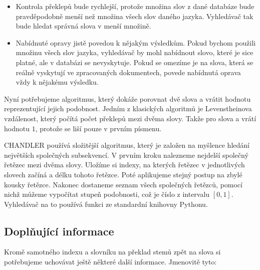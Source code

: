 \documentclass[12pt]{article}
\newcommand{\name}{CHANDLER}
\newcommand{\ssection}[1]{\subsection{#1}}
\begin{document}
\begin{itemize}
	\item Kontrola překlepů bude rychlejší, protože množina slov z dané databáze bude pravděpodobně menší než množina všech slov daného jazyka. Vyhledávač tak bude hledat správná slova v menší množině. 
	\item Nabídnuté opravy jistě povedou k nějakým výsledkům. Pokud bychom použili množinu všech slov jazyka, vyhledávač by mohl nabídnout slovo, které je sice platné, ale v databázi se nevyskytuje. Pokud se omezíme je na slova, která se reálně vyskytují ve zpracovaných dokumentech, povede nabídnutá oprava vždy k nějakému výsledku.
\end{itemize}

Nyní potřebujeme algoritmus, který dokáže porovnat dvě slova a vrátit hodnotu reprezentující jejich podobnost. Jedním z klasických algoritmů je Levenstheinova vzdálenost, který počítá počet překlepů mezi dvěma slovy. Takže pro slova  a  vrátí hodnotu $1$, protože se liší pouze v prvním písmenu. 

\name{} používá složitější algoritmus, který je založen na myšlence hledání největších společných subsekvencí. V prvním kroku nalezneme nejdelší společný řetězec mezi dvěma slovy. Uložíme si indexy, na kterých řetězec v jednotlivých slovech začíná a délku tohoto řetězce. Poté aplikujeme stejný postup na zbylé kousky řetězce. Nakonec dostaneme seznam všech společných řetězců, pomocí nichž můžeme vypočítat stupeň podobnosti, což je číslo z intervalu $[0, 1]$. Vyhledávač na to používá funkci ze standardní knihovny Pythonu. 






\ssection{Doplňující informace}
Kromě samotného indexu a slovníku na překlad stemů zpět na slova si potřebujeme uchovávat ještě některé další informace. Jmenovitě tyto: 
\end{document}
